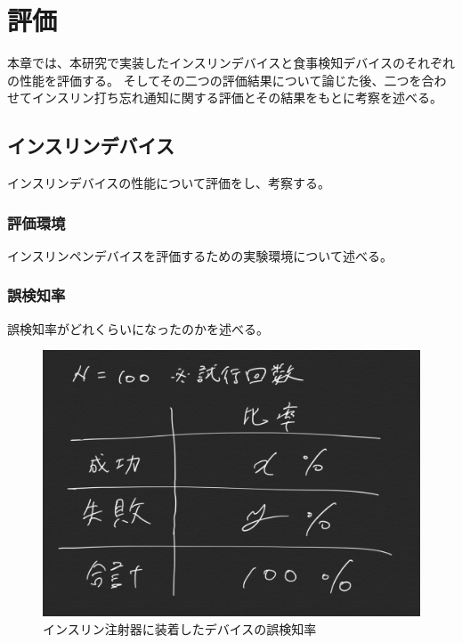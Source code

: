 \chapter{評価}
\label{chap:evaluation}

本章では、本研究で実装したインスリンデバイスと食事検知デバイスのそれぞれの性能を評価する。
そしてその二つの評価結果について論じた後、二つを合わせてインスリン打ち忘れ通知に関する評価とその結果をもとに考察を述べる。

\section{インスリンデバイス}
インスリンデバイスの性能について評価をし、考察する。

\subsection{評価環境}
インスリンペンデバイスを評価するための実験環境について述べる。

\subsection{誤検知率}
誤検知率がどれくらいになったのかを述べる。

\begin{figure}[htbp]
  \caption{インスリン注射器に装着したデバイスの誤検知率}
  \label{fig:success_failure_rate}
  \begin{center}
    \includegraphics[bb=0 0 1000 450,width=20cm]{assets/success_failure_rate.png}
  \end{center}
\end{figure}

